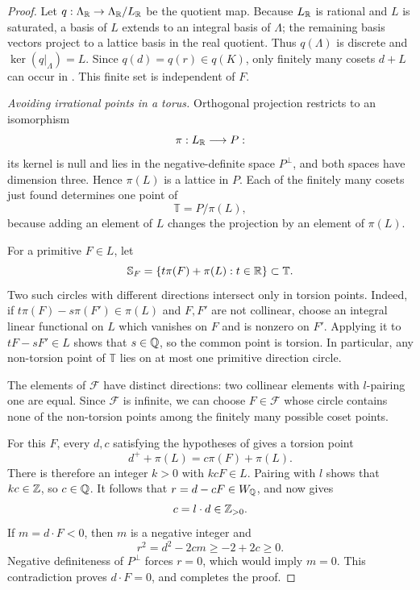 \begin{proof}
Let \(q:\Lambda_{\mathbb R}\to\Lambda_{\mathbb R}/L_{\mathbb R}\) be the quotient map.
Because \(L_{\mathbb R}\) is rational and \(L\) is saturated, a basis of \(L\)
extends to an integral basis of \(\Lambda\); the remaining basis
vectors project to a lattice basis in the real quotient.  Thus
\(q(\Lambda)\) is discrete and \(\ker(q|_\Lambda)=L\).
Since \(q(d)=q(r)\in q(K)\), only finitely many cosets \(d+L\) can occur
in .  This finite set is independent
of \(F\).

\smallskip
\noindent\emph{Avoiding irrational points in a torus.}
Orthogonal projection restricts to an isomorphism
\[
  \pi:L_{\mathbb R}\longrightarrow P:
\]
its kernel is null and lies in the negative-definite space \(P^\perp\),
and both spaces have dimension three.  Hence \(\pi(L)\) is a lattice
in \(P\).  Each of the finitely many cosets just found determines one
point of
\[
  \mathbb T=P/\pi(L),
\]
because adding an element of \(L\) changes the projection by an
element of \(\pi(L)\).

For a primitive \(F\in L\), let
\[
  \mathbb S_F=\{t\pi(F)+\pi(L):t\in\mathbb R\}\subset\mathbb T.
\]
Two such circles with different directions intersect only in torsion
points.  Indeed, if
\(t\pi(F)-s\pi(F')\in\pi(L)\) and \(F,F'\) are not collinear, choose
an integral linear functional on \(L\) which vanishes on \(F\) and is
nonzero on \(F'\).  Applying it to
\(tF-sF'\in L\) shows that \(s\in\mathbb Q\), so the common point is torsion.
In particular, any non-torsion point of \(\mathbb T\) lies on at most
one primitive direction circle.

The elements of \(\mathcal F\) have distinct directions: two collinear
elements with \(l\)-pairing one are equal.  Since \(\mathcal F\) is
infinite, we can choose \(F\in\mathcal F\) whose circle contains none
of the non-torsion points among the finitely many possible coset
points.

For this \(F\), every \(d,c\) satisfying the hypotheses of
 gives a torsion point
\[
  d^++\pi(L)=c\pi(F)+\pi(L).
\]
There is therefore an integer \(k>0\) with \(kcF\in L\).  Pairing with
\(l\) shows that \(kc\in\mathbb Z\), so \(c\in\mathbb Q\).  It follows that
\(r=d-cF\in W_{\mathbb Q}\), and  now gives
\begin{equation}
\label{eq:lattice-integral-coefficient}
  c=l\cdot d\in\mathbb Z_{>0}.
\end{equation}
If \(m=d\cdot F<0\), then \(m\) is a negative integer and
\[
  r^2=d^2-2cm\geq-2+2c\geq0.
\]
Negative definiteness of \(P^\perp\) forces \(r=0\), which would imply
\(m=0\).  This contradiction proves \(d\cdot F=0\), and completes the
proof.
\end{proof}

